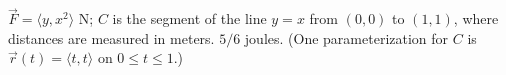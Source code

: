 {$\vec F = \langle y,x^2\rangle$ N; $C$ is the segment of the line $y=x$ from $(0,0)$ to $(1,1)$, where distances are measured in meters.
}
{$5/6$ joules. (One parameterization for $C$ is $\vec r(t) = \langle t,t\rangle$ on $0\leq t\leq 1$.)
}
